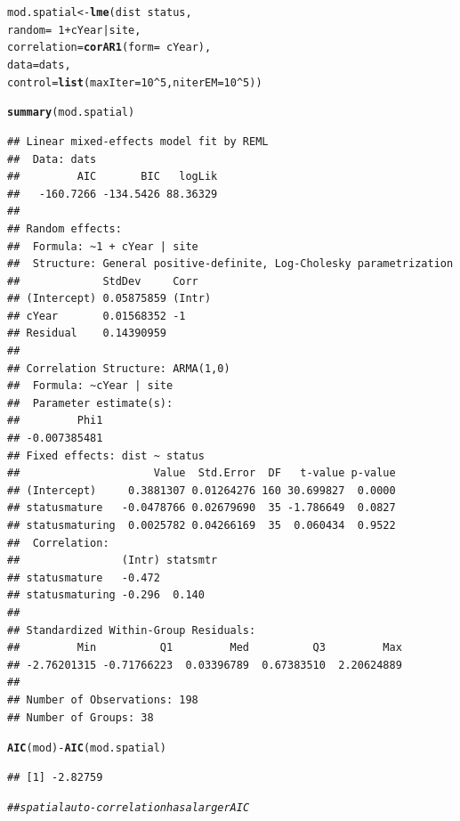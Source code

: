 \documentclass{article}\usepackage[]{graphicx}\usepackage[]{color}
\makeatletter
\newcommand{\hlnum}[1]{\textcolor[rgb]{0.686,0.059,0.569}{#1}}%
\newcommand{\hlcom}[1]{\textcolor[rgb]{0.678,0.584,0.686}{\textit{#1}}}%
\newcommand{\hlopt}[1]{\textcolor[rgb]{0,0,0}{#1}}%
\newcommand{\hlstd}[1]{\textcolor[rgb]{0.345,0.345,0.345}{#1}}%
\newcommand{\hlkwb}[1]{\textcolor[rgb]{0.69,0.353,0.396}{#1}}%
\newcommand{\hlkwc}[1]{\textcolor[rgb]{0.333,0.667,0.333}{#1}}%
\newcommand{\hlkwd}[1]{\textcolor[rgb]{0.737,0.353,0.396}{\textbf{#1}}}%
\newenvironment{kframe}{%
 \def\at@end@of@kframe{}%
 \ifinner\ifhmode%
  \def\at@end@of@kframe{\end{minipage}}%
  \begin{minipage}{\columnwidth}%
 \fi\fi%
 \def\FrameCommand##1{\hskip\@totalleftmargin \hskip-\fboxsep
 \colorbox{shadecolor}{##1}\hskip-\fboxsep
     \hskip-\linewidth \hskip-\@totalleftmargin \hskip\columnwidth}%
 \MakeFramed {\advance\hsize-\width
   \@totalleftmargin\z@ \linewidth\hsize
   \@setminipage}}%
 {\par\unskip\endMakeFramed%
 \at@end@of@kframe}
\newenvironment{knitrout}{}{} %
\makeatother
\begin{document}
\begin{knitrout}
\color{fgcolor}\begin{kframe}
\begin{alltt}
\hlstd{mod.spatial} \hlkwb{<-} \hlkwd{lme}\hlstd{(dist} \hlopt{~} \hlstd{status,}
                   \hlkwc{random} \hlstd{=} \hlopt{~} \hlnum{1} \hlopt{+} \hlstd{cYear} \hlopt{|} \hlstd{site,}
                   \hlkwc{correlation}\hlstd{=}\hlkwd{corAR1}\hlstd{(}\hlkwc{form}\hlstd{=}\hlopt{~}\hlstd{cYear),}
                   \hlkwc{data}\hlstd{=dats,}
                   \hlkwc{control}\hlstd{=}\hlkwd{list}\hlstd{(}\hlkwc{maxIter}\hlstd{=}\hlnum{10}\hlopt{^}\hlnum{5}\hlstd{,} \hlkwc{niterEM}\hlstd{=}\hlnum{10}\hlopt{^}\hlnum{5}\hlstd{))}

\hlkwd{summary}\hlstd{(mod.spatial)}
\end{alltt}
\begin{verbatim}
## Linear mixed-effects model fit by REML
##  Data: dats 
##         AIC       BIC   logLik
##   -160.7266 -134.5426 88.36329
## 
## Random effects:
##  Formula: ~1 + cYear | site
##  Structure: General positive-definite, Log-Cholesky parametrization
##             StdDev     Corr  
## (Intercept) 0.05875859 (Intr)
## cYear       0.01568352 -1    
## Residual    0.14390959       
## 
## Correlation Structure: ARMA(1,0)
##  Formula: ~cYear | site 
##  Parameter estimate(s):
##         Phi1 
## -0.007385481 
## Fixed effects: dist ~ status 
##                     Value  Std.Error  DF   t-value p-value
## (Intercept)     0.3881307 0.01264276 160 30.699827  0.0000
## statusmature   -0.0478766 0.02679690  35 -1.786649  0.0827
## statusmaturing  0.0025782 0.04266169  35  0.060434  0.9522
##  Correlation: 
##                (Intr) statsmtr
## statusmature   -0.472         
## statusmaturing -0.296  0.140  
## 
## Standardized Within-Group Residuals:
##         Min          Q1         Med          Q3         Max 
## -2.76201315 -0.71766223  0.03396789  0.67383510  2.20624889 
## 
## Number of Observations: 198
## Number of Groups: 38
\end{verbatim}
\begin{alltt}
\hlkwd{AIC}\hlstd{(mod)} \hlopt{-}\hlkwd{AIC}\hlstd{(mod.spatial)}
\end{alltt}
\begin{verbatim}
## [1] -2.82759
\end{verbatim}
\begin{alltt}
\hlcom{## spatial auto-correlation has a larger AIC}
\end{alltt}
\end{kframe}
\end{knitrout}
\end{document}
